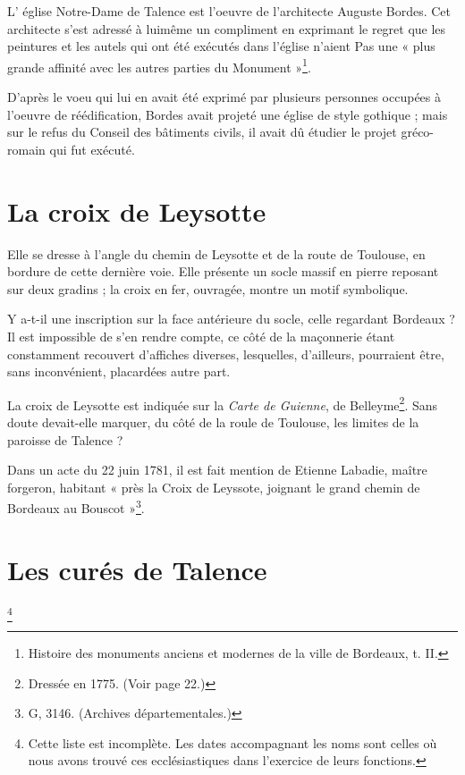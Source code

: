 \documentclass[a4paper,11pt]{book}
\begin{document}
L' église Notre-Dame de Talence est l'oeuvre de l'architecte Auguste Bordes. Cet architecte s'est adressé à luimême un compliment en exprimant le regret que les peintures et les autels qui ont été exécutés dans l'église n'aient Pas une « plus grande affinité avec les autres parties du Monument »\footnote{Histoire  des monuments anciens et modernes de la ville de Bordeaux, t. II.}.

D'après le voeu qui lui en avait été exprimé par plusieurs personnes occupées à l'oeuvre de réédification, Bordes avait projeté une église de style gothique ; mais sur le refus du Conseil des bâtiments civils, il avait dû étudier le projet gréco-romain qui fut exécuté.

\section{La croix de Leysotte}

Elle se dresse à l'angle du chemin de Leysotte et de la route de Toulouse, en bordure de cette dernière voie. Elle présente un socle massif en pierre reposant sur deux gradins ; la croix en fer, ouvragée, montre un motif symbolique.

Y a-t-il une inscription sur la face antérieure du socle, celle regardant Bordeaux ? Il est impossible de s'en rendre compte, ce côté de la maçonnerie étant constamment recouvert d'affiches diverses, lesquelles, d'ailleurs, pourraient être, sans inconvénient, placardées autre part.

La croix de Leysotte est indiquée sur la \textit{Carte de Guienne}, de Belleyme\footnote{Dressée en 1775. (Voir page 22.)}. Sans doute devait-elle marquer, du côté de la roule de Toulouse, les limites de la paroisse de Talence ?

Dans un acte du 22 juin 1781, il est fait mention de Etienne Labadie, maître forgeron, habitant « près la Croix de Leyssote, joignant le grand chemin de Bordeaux au Bouscot »\footnote{G, 3146. (Archives départementales.)}.


\section{Les curés de Talence}\footnote{Cette liste est incomplète. Les dates accompagnant les noms sont celles où nous avons trouvé ces ecclésiastiques dans l'exercice de leurs fonctions.}
\end{document}
